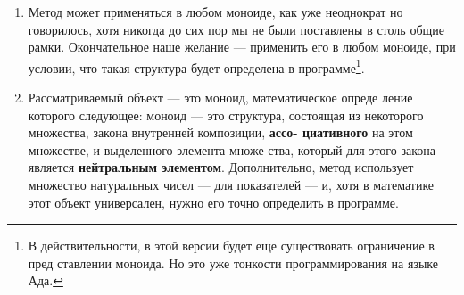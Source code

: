 \begin{enumerate}


\item Метод может применяться в любом моноиде, как уже неоднократ­
но говорилось, хотя никогда до сих пор мы не были поставлены в
столь общие рамки. Окончательное наше желание — применить
его в любом моноиде, при условии, что такая структура будет
определена в программе\footnote{В действительности, в этой версии будет еще существовать ограничение в пред­
ставлении моноида. Но это уже тонкости программирования на языке Ада.}.
\item Рассматриваемый объект — это моноид, математическое опреде­
ление которого следующее: моноид — это структура, состоящая
из некоторого множества, закона внутренней композиции, {\bf ассо-
циативного} на этом множестве, и выделенного элемента множе­
ства, который для этого закона является {\bf нейтральным элементом}. Дополнительно, метод использует множество натуральных
чисел — для показателей — и, хотя в математике этот объект
универсален, нужно его точно определить в программе.

\newpage


\end{enumerate}
